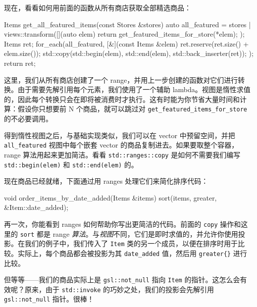 现在，看看如何用前面的函数从所有商店获取全部精选商品：

\begin{codebox}[cpp]
Items get_all_featured_items(const Stores &stores) {
    auto all_featured = stores
                        | views::transform([](auto elem) {
                            return get_featured_items_for_store(*elem);
                        });
    Items ret{};
    for_each(all_featured, [&](const Items &elem) {
        ret.reserve(ret.size() + elem.size());
        std::copy(std::begin(elem), std::end(elem),  std::back_inserter(ret));
    });
    return ret;
}
\end{codebox}

这里，我们从所有商店创建了一个 range，并用上一步创建的函数对它们进行转换。由于需要先解引用每个元素，我们使用了一个辅助 lambda。视图是惰性求值的，因此每个转换只会在即将被消费时才执行。这有时能为你节省大量时间和计算：假设你只想要前 N 个商品，就可以跳过对 \texttt{get\_\allowbreak{}featured\_\allowbreak{}items\_\allowbreak{}for\_\allowbreak{}store} 的不必要调用。

得到惰性视图之后，与基础实现类似，我们可以在 vector 中预留空间，并把 \texttt{all\_\allowbreak{}featured} 视图中每个嵌套 vector 的商品复制进去。如果要取整个容器，range 算法用起来更加简洁。看看 \texttt{std::\allowbreak{}ranges::\allowbreak{}copy} 是如何不需要我们编写 \texttt{std::\allowbreak{}begin(\allowbreak{}elem)\allowbreak{}} 和 \texttt{std::\allowbreak{}end(\allowbreak{}elem)\allowbreak{}} 的。

现在商品已经就绪，下面通过用 ranges 处理它们来简化排序代码：

\begin{codebox}[text]
void order_items_by_date_added(Items &items) {
    sort(items, greater{}, &Item::date_added);
}
\end{codebox}

再一次，你能看到 ranges 如何帮助你写出更简洁的代码。前面的 \texttt{copy} 操作和这里的 \texttt{sort} 都是 range \emph{算法}。与\emph{视图}不同，它们是即时求值的，并允许你使用投影。在我们的例子中，我们传入了 \texttt{Item} 类的另一个成员，以便在排序时用于比较。实际上，每个商品都会被投影为其 \texttt{date\_\allowbreak{}added} 值，然后用 \texttt{greater\{\allowbreak{}\}\allowbreak{}} 进行比较。

但等等——我们的商品实际上是 \texttt{gsl::\allowbreak{}not\_\allowbreak{}null} 指向 \texttt{Item} 的指针。这怎么会有效呢？原来，由于 \texttt{std::\allowbreak{}invoke} 的巧妙之处，我们的投影会先解引用 \texttt{gsl::\allowbreak{}not\_\allowbreak{}null} 指针。很棒！

